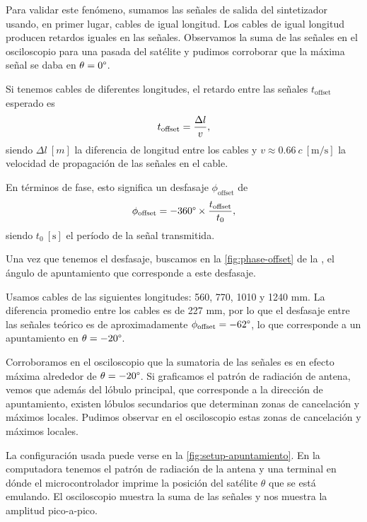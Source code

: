 \documentclass{article}
\newenvironment{standalone}{\begin{preview}}{\end{preview}}
\begin{document}
\begin{standalone}
  Para validar este fenómeno, sumamos las señales de salida del sintetizador usando, en primer lugar, cables de igual longitud.
  Los cables de igual longitud producen retardos iguales en las señales.
  Observamos la suma de las señales en el osciloscopio para una pasada del satélite y pudimos corroborar que la máxima señal se daba en $\theta = 0\degree$.


  Si tenemos cables de diferentes longitudes, el retardo entre las señales $t_{\text{offset}}$ esperado es
  \begin{equation}
    t_{\text{offset}} = \frac{\Delta l}{v},
    \tagaddtext{[\si{\second}]}
  \end{equation}
  siendo $\Delta l \ [\si{m}]$ la diferencia de longitud entre los cables y $v \approx 0.66 \ c\ [\si{\meter\per\second}]$ la velocidad de propagación de las señales en el cable.

  En términos de fase, esto significa un desfasaje $\phi_{\text{offset}}$ de
  \begin{equation}
    \phi_{\text{offset}} = - 360\degree \times \frac{t_{\text{offset}}}{t_0},
    \tagaddtext{[\si{\degree}]}
  \end{equation}
  siendo $t_0 \ [\si{\second}]$ el período de la señal transmitida.

  Una vez que tenemos el desfasaje, buscamos en la \cref{fig:phase-offset} de la , el ángulo de apuntamiento que corresponde a este desfasaje.

  Usamos cables de las siguientes longitudes: 560, 770, 1010 y 1240 mm.
  La diferencia promedio entre los cables es de 227 mm, por lo que el desfasaje entre las señales teórico es de aproximadamente $\phi_{\text{offset}} = - 62\degree$, lo que corresponde a un apuntamiento en $\theta = -20\degree$.

  Corroboramos en el osciloscopio que la sumatoria de las señales es en efecto máxima alrededor de $\theta = -20\degree$.
  Si graficamos el patrón de radiación de antena, vemos que además del lóbulo principal, que corresponde a la dirección de apuntamiento, existen lóbulos secundarios que determinan zonas de cancelación y máximos locales.
  Pudimos observar en el osciloscopio estas zonas de cancelación y máximos locales.

  La configuración usada puede verse en la \cref{fig:setup-apuntamiento}.
  En la computadora tenemos el patrón de radiación de la antena y una terminal en dónde el microcontrolador imprime la posición del satélite $\theta$ que se está emulando.
  El osciloscopio muestra la suma de las señales y nos muestra la amplitud pico-a-pico.


\end{standalone}
\end{document}
